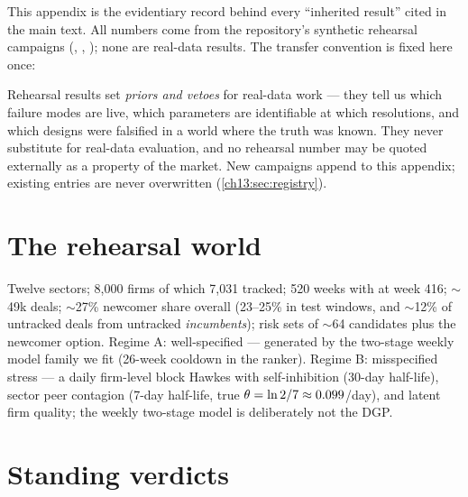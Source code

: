 
This appendix is the evidentiary record behind every ``inherited
result'' cited in the main text. All numbers come from the repository's
synthetic rehearsal campaigns (,
, ); none are real-data results. The
transfer convention is fixed here once:

\begin{protocol}\label{prot:appres:transfer}
Rehearsal results set \emph{priors and vetoes} for real-data work ---
they tell us which failure modes are live, which parameters are
identifiable at which resolutions, and which designs were falsified in
a world where the truth was known. They never substitute for real-data
evaluation, and no rehearsal number may be quoted externally as a
property of the market. New campaigns append to this appendix; existing
entries are never overwritten (\cref{ch13:sec:registry}).
\end{protocol}

\section*{The rehearsal world}

Twelve sectors; 8{,}000 firms of which 7{,}031 tracked; 520 weeks with
 at week 416; $\sim$49k deals; $\sim$27\% newcomer
share overall (23--25\% in test windows, and $\sim$12\% of untracked
deals from untracked \emph{incumbents}); risk sets of $\sim$64
candidates plus the newcomer option. Regime A: well-specified ---
generated by the two-stage weekly model family we fit (26-week cooldown
in the ranker). Regime B: misspecified stress --- a daily firm-level
block Hawkes with self-inhibition (30-day half-life), sector peer
contagion (7-day half-life, true $\theta = \ln 2/7 \approx
0.099$/day), and latent firm quality; the weekly two-stage model is
deliberately not the DGP.

\section*{Standing verdicts}

